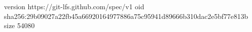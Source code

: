 version https://git-lfs.github.com/spec/v1
oid sha256:29b09027a22fb45a66920164977886a75c95941d89666b310dac2e5bf77e813b
size 54080
